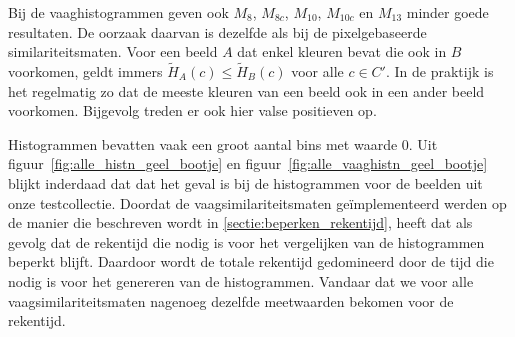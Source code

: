 Bij de vaaghistogrammen geven ook $M_8$, $M_{8c}$, $M_{10}$, $M_{10c}$ en $M_{13}$ minder goede resultaten.
De oorzaak daarvan is dezelfde als bij de pixelgebaseerde similariteitsmaten. Voor een beeld $A$ dat enkel
kleuren bevat die ook in $B$ voorkomen, geldt immers $\widetilde{H}_A(c) \leq \widetilde{H}_B(c)$ voor 
alle $c \in C'$. In de praktijk is het regelmatig zo dat de meeste kleuren van een beeld ook in een
ander beeld voorkomen. Bijgevolg treden er ook hier valse positieven op.

Histogrammen bevatten vaak een groot aantal bins met waarde $0$. Uit 
figuur~\ref{fig:alle_histn_geel_bootje} en figuur~\ref{fig:alle_vaaghistn_geel_bootje} blijkt 
inderdaad dat dat het geval is bij de histogrammen voor de beelden uit onze testcollectie. 
Doordat de vaagsimilariteitsmaten ge\"implementeerd werden op de manier die beschreven wordt in 
\ref{sectie:beperken_rekentijd}, heeft dat als gevolg dat de rekentijd die nodig is voor het 
vergelijken van de histogrammen beperkt blijft. Daardoor wordt de totale rekentijd gedomineerd door 
de tijd die nodig is voor het genereren van de histogrammen. Vandaar dat we voor alle 
vaagsimilariteitsmaten nagenoeg dezelfde meetwaarden bekomen voor de rekentijd. 


